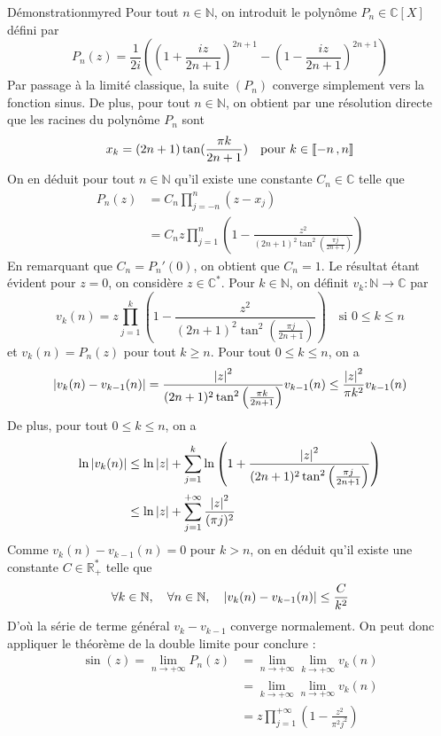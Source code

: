     \begin{demo}{Démonstration}{myred}
        Pour tout $n \in \mathbb{N}$, on introduit le polynôme $P_n \in \mathbb{C}[X]$ défini par 
        \[ P_n(z) = \frac{1}{2i} \left(\left(1 + \frac{iz}{2n+1}\right)^{2n+1} - \left(1 - \frac{iz}{2n+1}\right)^{2n+1}\right)\]
        Par passage à la limité classique, la suite $(P_n)$ converge simplement vers la fonction sinus. De plus, pour tout $n \in \mathbb{N}$, on obtient par une résolution directe que les racines du polynôme $P_n$ sont 
        \[ x_k = (2n+1)\tan(\frac{\pi k}{2n+1}) \quad \text{pour } k \in \left\llbracket -n \, , n \right\rrbracket \]
        On en déduit pour tout $n \in \mathbb{N}$ qu’il existe une constante $C_n \in \mathbb{C}$ telle que 
        \begin{align*}
            P_n(z) 
            &= C_n \prod_{j=-n}^{n} \left(z - x_j\right) \\
            &= C_n z \prod_{j=1}^n \left(1 - \frac{z^2}{(2n+1)^2 \tan^2 \left(\frac{\pi j}{2n+1}\right)}\right)
        \end{align*}
        En remarquant que $C_n = P_n'(0)$, on obtient que $C_n = 1$. Le résultat étant évident pour $z = 0$, on considère $z \in \mathbb{C}^*$. Pour $k \in \mathbb{N}$, on définit $v_k : \mathbb{N} \to \mathbb{C}$ par 
        \[ v_k(n) = z \prod_{j=1}^{k} \left(1 - \frac{z^2}{(2n+1)^2 \tan^2 \left(\frac{\pi j}{2n+1}\right)}\right) \quad \text{si } 0 \leq k \leq n \]
        et $v_k(n) = P_n(z)$ pour tout $k \geq n$. Pour tout $0 \leq k \leq n$, on a 
        \[ \left\lvert v_k(n) - v_{k-1}(n)\right\rvert = \frac{\left\lvert z\right\rvert^2}{(2n+1)^2 \tan^2 \left(\frac{\pi k}{2n+1}\right)} v_{k-1}(n) \leq \frac{\left\lvert z\right\rvert^2}{\pi k^2} v_{k-1}(n) \]
        De plus, pour tout $0 \leq k \leq n$, on a 
        \begin{align*}
            \ln\left\lvert v_k(n)\right\rvert 
            &\leq \ln\left\lvert z\right\rvert + \sum_{j=1}^{k} \ln\left(1 + \frac{\left\lvert z\right\rvert^2}{(2n+1)^2\tan^2\left(\frac{\pi j}{2n+1}\right)}\right) \\
            &\leq \ln\left\lvert z\right\rvert + \sum_{j=1}^{+\infty} \frac{\left\lvert z\right\rvert^2}{(\pi j)^2}
        \end{align*}
        Comme $v_k(n) - v_{k-1}(n) = 0$ pour $k > n$, on en déduit qu’il existe une constante $C \in \mathbb{R}_+^*$ telle que 
        \[ \forall k \in \mathbb{N}, \quad \forall n \in \mathbb{N}, \quad \left\lvert v_k(n) - v_{k-1}(n)\right\rvert \leq \frac{C}{k^2} \]
        D’où la série de terme général $v_k - v_{k-1}$ converge normalement. On peut donc appliquer le théorème de la double limite pour conclure :
        \begin{align*}
            \sin(z) = \lim_{n \to +\infty} P_n(z) 
            &= \lim_{n \to +\infty} \lim_{k \to +\infty} v_k(n) \\
            &= \lim_{k \to +\infty} \lim_{n \to +\infty} v_k(n) \\
            &= z \prod_{j=1}^{+\infty} \left(1 - \frac{z^2}{\pi^2 j^2}\right)
        \end{align*}
    \end{demo}

